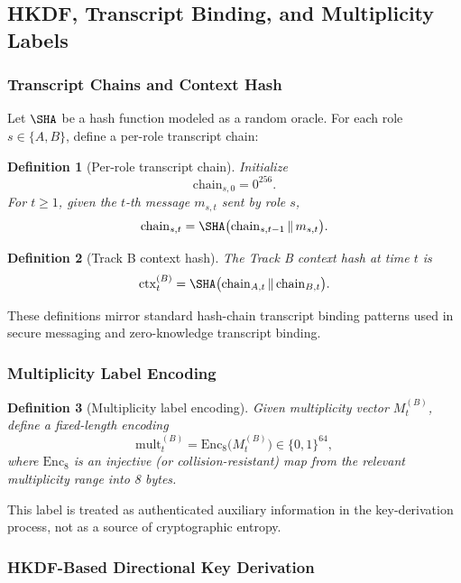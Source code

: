 \documentclass[11pt]{article}
\newtheorem{definition}{Definition}[section]
\begin{document}
\subsection{HKDF, Transcript Binding, and Multiplicity Labels}

\subsubsection{Transcript Chains and Context Hash}

Let \(\SHA\) be a hash function modeled as a random oracle.
For each role \(s \in \{A,B\}\), define a per-role transcript chain:

\begin{definition}[Per-role transcript chain]
Initialize
\[
  \mathrm{chain}_{s,0} = 0^{256}.
\]
For \(t \ge 1\), given the \(t\)-th message \(m_{s,t}\) sent by role \(s\),
\[
  \mathrm{chain}_{s,t} = \SHA\bigl( \mathrm{chain}_{s,t-1} \,\|\, m_{s,t} \bigr).
\]
\end{definition}

\begin{definition}[Track B context hash]
The Track B context hash at time \(t\) is
\[
  \mathrm{ctx}_t^{(B)} = \SHA\bigl( \mathrm{chain}_{A,t} \,\|\, \mathrm{chain}_{B,t} \bigr).
\]
\end{definition}

These definitions mirror standard hash-chain transcript binding patterns used in secure messaging and zero-knowledge transcript binding.\cite{CommitmentSchemeWiki}

\subsubsection{Multiplicity Label Encoding}

\begin{definition}[Multiplicity label encoding]
Given multiplicity vector \(M_t^{(B)}\), define a fixed-length encoding
\[
  \mathrm{mult}_t^{(B)} = \mathrm{Enc}_8\bigl(M_t^{(B)}\bigr) \in \{0,1\}^{64},
\]
where \(\mathrm{Enc}_8\) is an injective (or collision-resistant) map from the relevant multiplicity range into 8 bytes.
\end{definition}

This label is treated as authenticated auxiliary information in the key-derivation process, not as a source of cryptographic entropy.

\subsubsection{HKDF-Based Directional Key Derivation}
\end{document}

